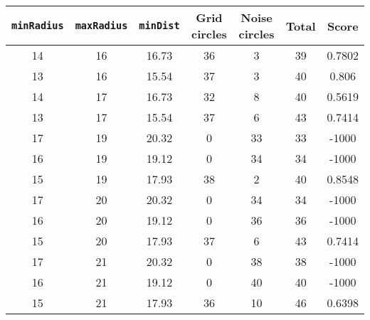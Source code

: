 \documentclass[letterpaper, 12pt]{article}
\begin{document}
\begin{longtable}{|c|c|c|c|c|c|c|}
\hline
\textbf{\texttt{minRadius}} & \textbf{\texttt{maxRadius}} & \textbf{\texttt{minDist}} & \textbf{Grid circles} & \textbf{Noise circles} & \textbf{Total} & \textbf{Score} \\
\hline
14 & 16 & 16.73 & 36 & 3 & 39 & 0.7802 \\
\hline
13 & 16 & 15.54 & 37 & 3 & 40 & 0.806 \\
\hline
14 & 17 & 16.73 & 32 & 8 & 40 & 0.5619 \\
\hline
13 & 17 & 15.54 & 37 & 6 & 43 & 0.7414 \\
\hline
17 & 19 & 20.32 & 0 & 33 & 33 & -1000 \\
\hline
16 & 19 & 19.12 & 0 & 34 & 34 & -1000 \\
\hline
15 & 19 & 17.93 & 38 & 2 & 40 & 0.8548 \\
\hline
17 & 20 & 20.32 & 0 & 34 & 34 & -1000 \\
\hline
16 & 20 & 19.12 & 0 & 36 & 36 & -1000 \\
\hline
15 & 20 & 17.93 & 37 & 6 & 43 & 0.7414 \\
\hline
17 & 21 & 20.32 & 0 & 38 & 38 & -1000 \\
\hline
16 & 21 & 19.12 & 0 & 40 & 40 & -1000 \\
\hline
15 & 21 & 17.93 & 36 & 10 & 46 & 0.6398 \\
\hline
\end{longtable}
\end{document}
